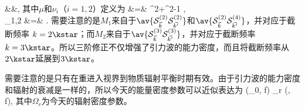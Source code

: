 &&\times {},
\n
其中$\mu$和$\nu_i$（$i=1,2$）定义为
\m
\mu &=& {\tp^2+\tk^2-1 \tp \tk}, \\
\nu_{1,2} &=& .
\n
需要注意的是$M_1$来自于$\av{\mathcal{S}^{(2)}_{\vec{k}} \mathcal{S}^{(2)}_{\vec{k'}}}$和$\av{\mathcal{S}^{(2)}_{\vec{k}} \mathcal{S}^{(4)}_{\vec{k'}}}$，并对应于截断频率 $k=2\kstar$；而$M_2$来自于$\av{\mathcal{S}^{(3)}_{\vec{k}} \mathcal{S}^{(3)}_{\vec{k'}}}$，并对应于截断频率$k=3\kstar$。所以三阶修正不仅增强了引力波的能力密度，而且将截断频率从$2\kstar$延展到$3\kstar$。

需要注意的是只有在重进入视界到物质辐射平衡时期有效。由于引力波的能力密度和辐射的衰减是一样的，所以今天的能量密度参数可以近似表达为\cite{Espinosa:2017sgp}
\e
\ogw(\eta_0, f) \simeq \Omega_{r} \times \ogw(\eta, f),
\q
其中$\Omega_{r}$为今天的辐射密度参数。



